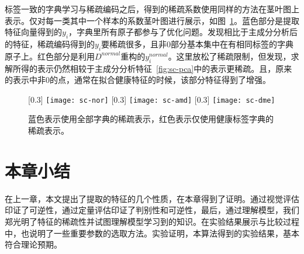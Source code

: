     标签一致的字典学习与稀疏编码之后，得到的稀疏系数使用同样的方法在茎叶图上表示。仅对每一类其中一个样本的系数茎叶图进行展示，如图~\ref{fig:sc-dict}。蓝色部分是提取特征向量得到的$y_i$，字典里所有原子都参与了优化问题。发现相比于主成分分析后的特征，稀疏编码得到的$y_i$要稀疏很多，且非0部分基本集中在有相同标签的字典原子上。红色部分是利用$D^{normal}$重构的$y^{normal}_i$。这里放松了稀疏限制，但发现，求解所得的表示仍然相较于主成分分析特征~\ref{fig:sc-pca}中的表示更稀疏。且，原来的表示中非0的点，通常在拟合健康特征的时候，该部分特征得到了增强。 

    \begin{figure}[H]
      \centering%
      [0.3\textwidth] %
        {\texttt{[image: sc-nor]}} 
      [0.3\textwidth] %
        {\texttt{[image: sc-amd]}} 
      [0.3\textwidth] %
        {\texttt{[image: sc-dme]}} 
      \caption[稀疏编码]{蓝色表示使用全部字典的稀疏表示，红色表示仅使用健康标签字典的稀疏表示。}
      \label{fig:sc-dict}
    \end{figure}

\section{本章小结}
    在上一章，本文提出了提取的特征的几个性质，在本章得到了证明。通过视觉评估印证了可逆性，通过定量评估印证了判别性和可逆性，最后，通过理解模型，我们郑光明了特征的稀疏性并试图理解模型学习到的知识。在实验结果展示与比较过程中，也说明了一些重要参数的选取方法。实验证明，本算法得到的实验结果，基本符合理论预期。


